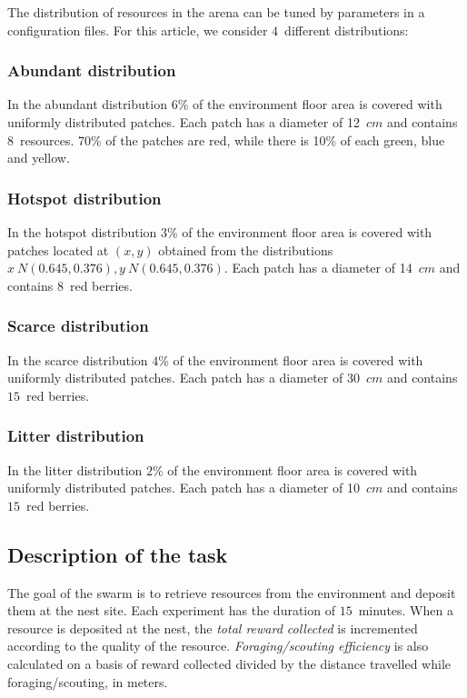 \documentclass[runningheads]{llncs}
\begin{document}
The distribution of resources in the arena can be tuned by parameters in a configuration files. For this article, we consider $4$~different distributions:

\vspace{-4mm}
\subsubsection{Abundant distribution} 
In the abundant distribution $6$\% of the environment floor area is covered with uniformly distributed patches. Each patch has a diameter of 12~$cm$ and contains $8$~resources. 70\% of the patches are red, while there is 10\% of each green, blue and yellow.

\vspace{-4mm}
\subsubsection{Hotspot distribution} In the hotspot distribution $3$\% of the environment floor area is covered with patches located at $(x,y)$ obtained from the distributions $x~N(0.645, 0.376),y~N(0.645, 0.376)$. Each patch has a diameter of 14~$cm$ and contains $8$~red berries. 

\vspace{-4mm}
\subsubsection{Scarce distribution}
In the scarce distribution $4$\% of the environment floor area is covered with uniformly distributed patches. Each patch has a diameter of 30~$cm$ and contains $15$~red berries. 

\vspace{-4mm}
\subsubsection{Litter distribution}
In the litter distribution $2$\% of the environment floor area is covered with uniformly distributed patches. Each patch has a diameter of 10~$cm$ and contains $15$~red berries.

\subsection{Description of the task} 
The goal of the swarm is to retrieve resources from the environment and deposit them at the nest site. Each experiment has the duration of $15$~minutes. When a resource is deposited at the nest, the \emph{total reward collected} is incremented according to the quality of the resource. \emph{Foraging/scouting efficiency} is also calculated on a basis of reward collected divided by the distance travelled while foraging/scouting, in meters.
\end{document}
